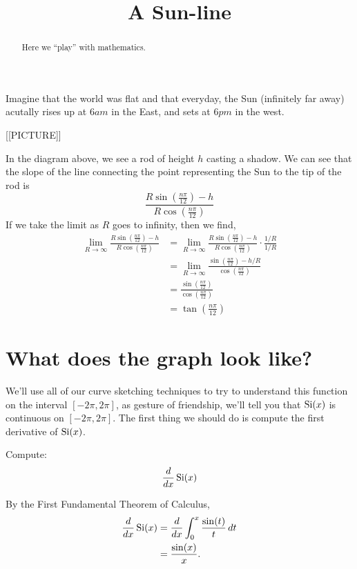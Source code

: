 \documentclass{ximera}
\title[Dig-In:]{A Sun-line}
\begin{document}
\begin{abstract}
  Here we ``play'' with mathematics.
\end{abstract}
\maketitle

Imagine that the world was flat and that everyday, the Sun (infinitely
far away) acutally rises up at $6\unit{am}$ in the East, and sets at
$6\unit{pm}$ in the west.

[[PICTURE]]

In the diagram above, we see a rod of height $h$ casting a shadow. We
can see that the slope of the line connecting the point representing
the Sun to the tip of the rod is
\[
\frac{R\sin\left(\frac{n\pi}{12}\right)-h}{R\cos\left(\frac{n\pi}{12}\right)}
\]
If we take the limit as $R$ goes to infinity, then we find,
\begin{align*}
  \lim_{R\to \infty} \frac{R\sin\left(\frac{n\pi}{12}\right)-h}{R\cos\left(\frac{n\pi}{12}\right)} &=\lim_{R\to \infty}\frac{R\sin\left(\frac{n\pi}{12}\right)-h}{R\cos\left(\frac{n\pi}{12}\right)}\cdot\frac{1/R}{1/R}\\
  &= \lim_{R\to \infty}\frac{\sin\left(\frac{n\pi}{12}\right)-h/R}{\cos\left(\frac{n\pi}{12}\right)}\\
  &= \frac{\sin\left(\frac{n\pi}{12}\right)}{\cos\left(\frac{n\pi}{12}\right)}\\
  &= \tan\left(\frac{n\pi}{12}\right)
\end{align*}

\section{What does the graph look like?}

We'll use all of our curve sketching techniques to try to understand
this function on the interval $[-2\pi,2\pi]$, as gesture of
friendship, we'll tell you that $\operatorname{Si}(x)$ is continuous on
$[-2\pi,2\pi]$.  The first thing we should do is compute the first
derivative of $\operatorname{Si}(x)$.

\begin{example}
  Compute:
  \[
  \frac{d}{dx} \operatorname{Si}(x)
  \]
  \begin{explanation}
    By the First Fundamental Theorem of Calculus,
    \begin{align*}
    \frac{d}{dx} \operatorname{Si}(x) &= \frac{d}{dx} \int_0^x \frac{\sin(t)}{t}\,d t\\
    &=\frac{\sin(x)}{x}.
    \end{align*}
  \end{explanation}
\end{example}
\end{document}
